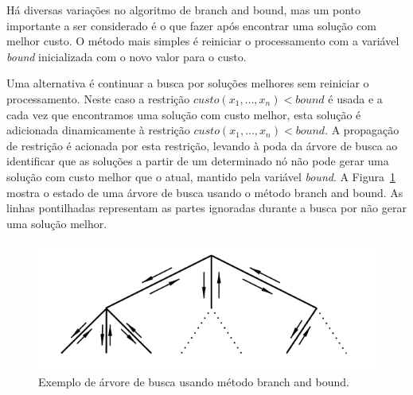 \begin{itemize}
{        Há diversas variações no algoritmo de branch and bound, mas um
        ponto importante a ser considerado é o que fazer após encontrar
        uma solução com melhor custo. O método mais simples é reiniciar
        o processamento com a variável \textit{bound} inicializada com o
        novo valor para o custo.

        Uma alternativa é continuar a busca por soluções melhores sem
        reiniciar o processamento. Neste caso a restrição $custo(x_1,
        \ldots, x_n) < \textit{bound}$ é usada e a cada vez que
        encontramos uma solução com custo melhor, esta solução é
        adicionada dinamicamente à restrição $custo(x_1, \ldots, x_n) <
        \textit{bound}$. A propagação de restrição é acionada por esta
        restrição, levando à poda da árvore de busca ao identificar que
        as soluções a partir de um determinado nó não pode gerar uma
        solução com custo melhor que o atual, mantido pela variável
        \textit{bound}. A Figura~\ref{fig:bbsearchtree} mostra o estado
        de uma árvore de busca usando o método branch and bound. As
        linhas pontilhadas representam as partes ignoradas durante a
        busca por não gerar uma solução melhor.

        \begin{figure}[h]
            \centering 
            \includegraphics{images/bbsearchtree.png}
            \caption{Exemplo de árvore de busca usando método branch and
            bound.} 
            \label{fig:bbsearchtree}
        \end{figure}}

\end{itemize}
